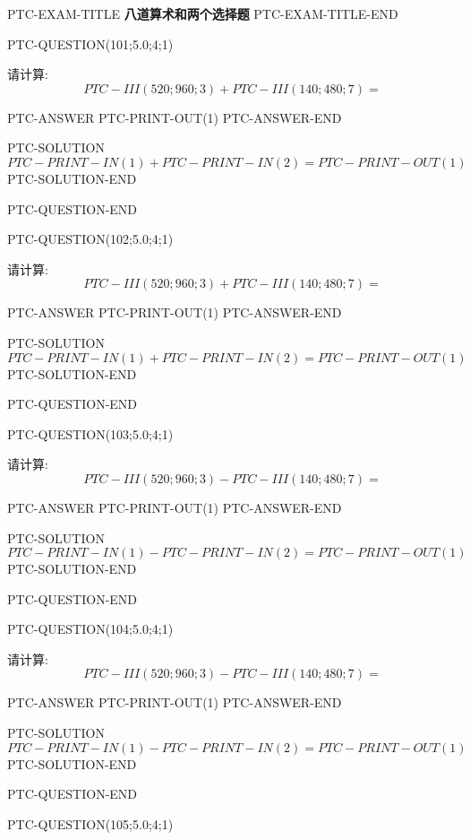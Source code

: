 \documentclass{ctexart}
\begin{document}
PTC-EXAM-TITLE
{\LARGE {\textbf{ 八道算术和两个选择题}}}
PTC-EXAM-TITLE-END




PTC-QUESTION(101;5.0;4;1)

请计算: 
\begin{equation}
PTC-III (520; 960; 3) + PTC-III (140; 480; 7) = \nonumber 
\end{equation}

PTC-ANSWER
   PTC-PRINT-OUT(1)
PTC-ANSWER-END

PTC-SOLUTION
$PTC-PRINT-IN(1) + PTC-PRINT-IN(2)=  PTC-PRINT-OUT(1)$
PTC-SOLUTION-END

PTC-QUESTION-END




PTC-QUESTION(102;5.0;4;1)

请计算: 
\begin{equation}
PTC-III (520; 960; 3) + PTC-III (140; 480; 7) = \nonumber 
\end{equation}

PTC-ANSWER
   PTC-PRINT-OUT(1)
PTC-ANSWER-END

PTC-SOLUTION
$PTC-PRINT-IN(1) + PTC-PRINT-IN(2)=  PTC-PRINT-OUT(1)$
PTC-SOLUTION-END

PTC-QUESTION-END




PTC-QUESTION(103;5.0;4;1)

请计算: 
\begin{equation}
PTC-III (520; 960; 3) -  PTC-III (140; 480; 7) = \nonumber 
\end{equation}

PTC-ANSWER
   PTC-PRINT-OUT(1)
PTC-ANSWER-END

PTC-SOLUTION
$PTC-PRINT-IN(1) - PTC-PRINT-IN(2)=  PTC-PRINT-OUT(1)$
PTC-SOLUTION-END

PTC-QUESTION-END




PTC-QUESTION(104;5.0;4;1)

请计算: 
\begin{equation}
PTC-III (520; 960; 3) -  PTC-III (140; 480; 7) = \nonumber 
\end{equation}

PTC-ANSWER
   PTC-PRINT-OUT(1)
PTC-ANSWER-END

PTC-SOLUTION
$PTC-PRINT-IN(1) - PTC-PRINT-IN(2)=  PTC-PRINT-OUT(1)$
PTC-SOLUTION-END

PTC-QUESTION-END




PTC-QUESTION(105;5.0;4;1)
\end{document}
